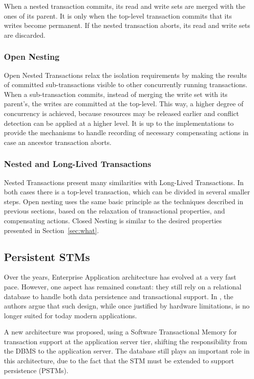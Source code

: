 \documentclass{llncs}
\begin{document}
When a nested transaction commits, its read and write sets are merged
with the ones of its parent. It is only when the top-level transaction
commits that its writes become permanent. If the nested transaction
aborts, its read and write sets are discarded.

\subsubsection{Open Nesting}

Open Nested Transactions relax the isolation requirements by making
the results of committed sub-transactions visible to other
concurrently running transactions. When a sub-transaction commits,
instead of merging the write set with its parent's, the writes are
committed at the top-level. This way, a higher degree of concurrency
is achieved, because resources may be released earlier and conflict
detection can be applied at a higher level. It is up to the
implementations to provide the mechanisms to handle recording of
necessary compensating actions in case an ancestor transaction aborts.

\subsubsection{Nested and Long-Lived Transactions}

Nested Transactions present many similarities with Long-Lived
Transactions. In both cases there is a top-level transaction, which
can be divided in several smaller steps. Open nesting uses the same
basic principle as the techniques described in previous sections,
based on the relaxation of transactional properties, and compensating
actions. Closed Nesting is similar to the desired properties presented
in Section~\ref{sec:what}.

\subsection{Persistent STMs}
\label{sec:pstm}

Over the years, Enterprise Application architecture has evolved at a
very fast pace. However, one aspect has remained constant: they still
rely on a relational database to handle both data persistence and
transactional support. In \cite{fernandes2011strict}, the authors
argue that such design, while once justified by hardware limitations,
is no longer suited for today modern applications.

A new architecture was proposed, using a Software Transactional Memory
for transaction support at the application server tier, shifting the
responsibility from the DBMS to the application server. The database
still plays an important role in this architecture, due to the fact
that the STM must be extended to support persistence (PSTMs).
\end{document}
